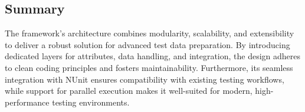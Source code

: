 \subsection{Summary}
The framework's architecture combines modularity, scalability, and extensibility to deliver a robust solution for advanced test data preparation. By introducing dedicated layers for attributes, data handling, and integration, the design adheres to clean coding principles and fosters maintainability. Furthermore, its seamless integration with NUnit ensures compatibility with existing testing workflows, while support for parallel execution makes it well-suited for modern, high-performance testing environments.
